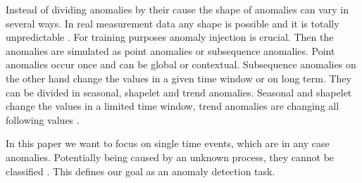 Instead of dividing anomalies by their cause the shape of anomalies can vary in several ways. In real measurement data any shape is possible and it is totally unpredictable . For training purposes anomaly injection is crucial. Then the anomalies are simulated as point anomalies or subsequence anomalies. Point anomalies occur once and can be global or contextual. Subsequence anomalies on the other hand change the values in a given time window or on long term. They can be divided in seasonal, shapelet and trend anomalies. Seasonal and shapelet change the values in a limited time window, trend anomalies are changing all following values . %

In this paper we want to focus on single time events, which are in any case anomalies. Potentially being caused by an unknown process, they cannot be classified . This defines our goal as an anomaly detection task.

